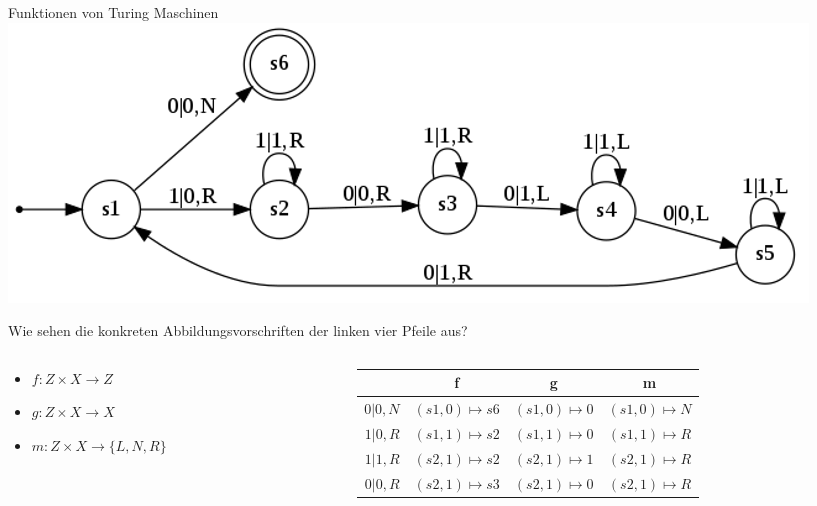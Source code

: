 \begin{frame}{Funktionen von Turing Maschinen}
	\includegraphics[scale=0.4]{images/turingexample_smallspacing.png}
	
	Wie sehen die konkreten Abbildungsvorschriften der linken vier Pfeile aus?
	
	\begin{columns}
		\begin{column}{0.3\textwidth}
			
			\vspace{.2cm}
			
			\begin{itemize}
				\item $f: Z \times X \rightarrow Z$
				\item $g: Z \times X \rightarrow X$
				\item $m: Z \times X \rightarrow \{L, N, R\}$
			\end{itemize}
		\end{column}
		
		\begin{column}{0.7\textwidth}
			\begin{tabular}{r || c | c | c}
				 & f & g & m\\\hline\hline
				 
				 $0|0,N$ & $(s1, 0) \mapsto s6$ & $(s1, 0) \mapsto 0$ & $(s1, 0) \mapsto N$ \\\hline
				 
				 \pause $1|0, R$ 
				 \pause & $(s1, 1) \mapsto s2$
				 \pause & $(s1, 1) \mapsto 0$
				 \pause & $(s1, 1) \mapsto R$ \\\hline
				 
				 \pause $1|1, R$ 
				 \pause & $(s2, 1) \mapsto s2$
				 \pause & $(s2, 1) \mapsto 1$
				 \pause & $(s2, 1) \mapsto R$ \\\hline
				 
				 \pause $0|0, R$ 
				 \pause & $(s2, 1) \mapsto s3$
				 \pause & $(s2, 1) \mapsto 0$
				 \pause & $(s2, 1) \mapsto R$ \\\hline
				
			\end{tabular}
		\end{column}
	\end{columns}

\end{frame}


